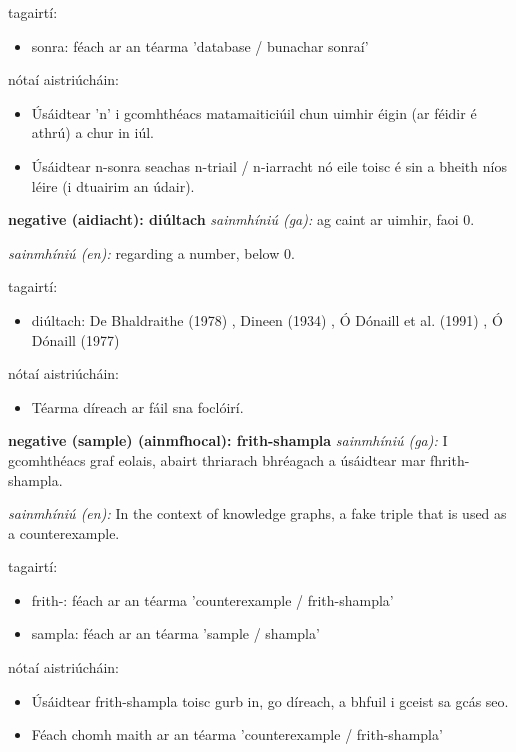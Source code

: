 \documentclass{article}
\begin{document}
tagairtí:
\begin{itemize}
	\item sonra: féach ar an téarma 'database / bunachar sonraí'
\end{itemize}

nótaí aistriúcháin:
\begin{itemize}
	\item Úsáidtear 'n' i gcomhthéacs matamaiticiúil chun uimhir éigin (ar féidir é athrú) a chur in iúl.
	\item Úsáidtear n-sonra seachas n-triail / n-iarracht nó eile toisc é sin a bheith níos léire (i dtuairim an údair).
\end{itemize}


\textbf{negative (aidiacht): diúltach}
\textit{sainmhíniú (ga):} ag caint ar uimhir, faoi 0.

\textit{sainmhíniú (en):} regarding a number, below 0.

tagairtí:
\begin{itemize}
	\item diúltach: De Bhaldraithe (1978) \cite{de-bhaldraithe}, Dineen (1934) \cite{dineen}, Ó Dónaill et al. (1991) \cite{focloir-beag}, Ó Dónaill (1977) \cite{odonaill}
\end{itemize}

nótaí aistriúcháin:
\begin{itemize}
	\item Téarma díreach ar fáil sna foclóirí.
\end{itemize}


\textbf{negative (sample) (ainmfhocal): frith-shampla}
\textit{sainmhíniú (ga):} I gcomhthéacs graf eolais, abairt thriarach bhréagach a úsáidtear mar fhrith-shampla.

\textit{sainmhíniú (en):} In the context of knowledge graphs, a fake triple that is used as a counterexample.

tagairtí:
\begin{itemize}
	\item frith-: féach ar an téarma 'counterexample / frith-shampla'
	\item sampla: féach ar an téarma 'sample / shampla'
\end{itemize}

nótaí aistriúcháin:
\begin{itemize}
	\item Úsáidtear frith-shampla toisc gurb in, go díreach, a bhfuil i gceist sa gcás seo.
	\item Féach chomh maith ar an téarma 'counterexample / frith-shampla'
\end{itemize}
\end{document}
